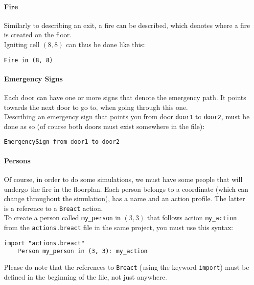 \documentclass[review]{elsarticle}
\begin{document}
\paragraph{Fire} Similarly to describing an exit, a fire can be described, which denotes where a fire is created on the floor.\\
Igniting cell $(8, 8)$ can thus be done like this:
\begin{lstlisting}[language=Bmod]
	Fire in (8, 8)
\end{lstlisting}

\paragraph{Emergency Signs} Each door can have one or more signs that denote the emergency path. It points towards the next door to go to, when going through this one.\\
Describing an emergency sign that points you from door \texttt{door1} to \texttt{door2}, must be done as so (of course both doors must exist somewhere in the file):
\begin{lstlisting}[language=Bmod]
	EmergencySign from door1 to door2
\end{lstlisting}

\paragraph{Persons} Of course, in order to do some simulations, we must have some people that will undergo the fire in the floorplan. Each person belongs to a coordinate (which can change throughout the simulation), has a name and an action profile. The latter is a reference to a \texttt{Breact} action.\\
To create a person called \texttt{my\_person} in $(3, 3)$ that follows action \texttt{my\_action} from the \texttt{actions.breact} file in the same project, you must use this syntax:
\begin{lstlisting}[language=Bmod]
	import "actions.breact"
	Person my_person in (3, 3): my_action
\end{lstlisting}
Please do note that the references to \texttt{Breact} (using the keyword \texttt{import}) must be defined in the beginning of the file, not just anywhere.
\end{document}
